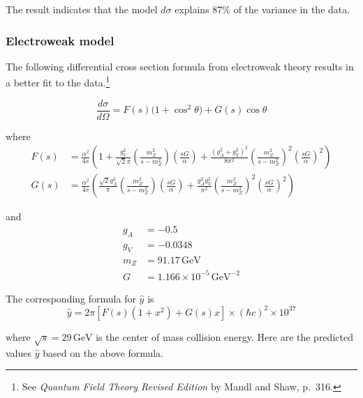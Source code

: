The result indicates that the model $d\sigma$ explains 87\% of the variance in the data.

\iffalse

\subsubsection*{Electroweak model}

The following differential cross section formula from electroweak
theory results in a better fit to the
data.\footnote
{See {\it Quantum Field Theory Revised Edition} by Mandl and Shaw, p.~316.}

\begin{equation*}
\frac{d\sigma}{d\Omega}=F(s)\bigl(1+\cos^2\theta\bigr)+G(s)\cos\theta
\end{equation*}

where
\begin{align*}
F(s)&=\frac{\alpha^2}{4s}
\left(
1+\frac{g_V^2}{\sqrt{2}\pi}\left(\frac{m_Z^2}{s-m_Z^2}\right)\left(\frac{sG}{\alpha}\right)
+\frac{(g_A^2+g_V^2)^2}{8\pi^2}\left(\frac{m_Z^2}{s-m_Z^2}\right)^2\left(\frac{sG}{\alpha}\right)^2
\right)
\\
G(s)&=\frac{\alpha^2}{4s}
\left(
\frac{\sqrt{2}g_A^2}{\pi}\left(\frac{m_Z^2}{s-m_Z^2}\right)\left(\frac{sG}{\alpha}\right)
+\frac{g_A^2g_V^2}{\pi^2}\left(\frac{m_Z^2}{s-m_Z^2}\right)^2\left(\frac{sG}{\alpha}\right)^2
\right)
\end{align*}

and
\begin{align*}
g_A&=-0.5
\\
g_V&=-0.0348
\\
m_Z&=91.17\,\text{GeV}
\\
G&=1.166\times10^{-5}\,\text{GeV}^{-2}
\end{align*}

The corresponding formula for $\hat{y}$ is
\begin{equation*}
\hat{y}=2\pi\left[F(s)(1+x^2)+G(s)x\right]\times(\hbar c)^2\times10^{37}
\end{equation*}

where $\sqrt{s}=29\,\text{GeV}$ is the center of mass collision energy.
Here are the predicted values $\hat{y}$ based on the above formula.

